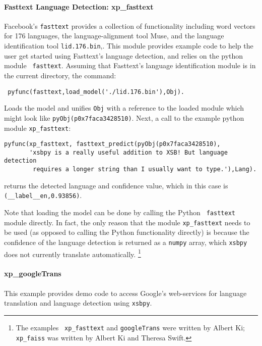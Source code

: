 \paragraph{Fasttext Language Detection: xp\_fasttext}
%
Facebook's {\tt fasttext} provides a collection of functionality
including word vectors for 176 languages, the language-alignment tool
Muse, and the language identification tool {\tt lid.176.bin},.  This
module provides example code to help the user get started using
Fasttext's language detection, and relies on the python module {\tt
  fasttext}.  Assuming that Fasttext's language identification module
is in the current directory, the command:
\begin{verbatim}
 pyfunc(fasttext,load_model('./lid.176.bin'),Obj).
\end{verbatim}
Loads the model and unifies {\tt Obj} with a reference to the loaded
module which might look like {\tt pyObj(p0x7faca3428510)}.  
Next, a call to the example python module {\tt xp\_fasttext}:
\begin{verbatim}
pyfunc(xp_fasttext, fasttext_predict(pyObj(p0x7faca3428510),
       'xsbpy is a really useful addition to XSB! But language detection
        requires a longer string than I usually want to type.'),Lang).  
\end{verbatim}
returns the detected language and confidence value, which in this case
is {\tt (\_\_label\_\_en,0.93856)}.

Note that loading the model can be done by calling the Python {\tt
  fasttext} module directly.  In fact, the only reason that the module
{\tt xp\_fasttext} needs to be used (as opposed to calling the Python
functionality directly) is because the confidence of the language
detection is returned as a {\tt numpy} array, which {\tt xsbpy} does
not currently translate automatically. \footnote{The examples {\tt
    xp\_fasttext} and {\tt googleTrans} were written by Albert Ki;
  {\tt xp\_faiss} was written by Albert Ki and Theresa Swift.}

\paragraph{xp\_googleTrans}
This example provides demo code to access Google's web-services for
language translation and language detection using {\tt xsbpy}.


